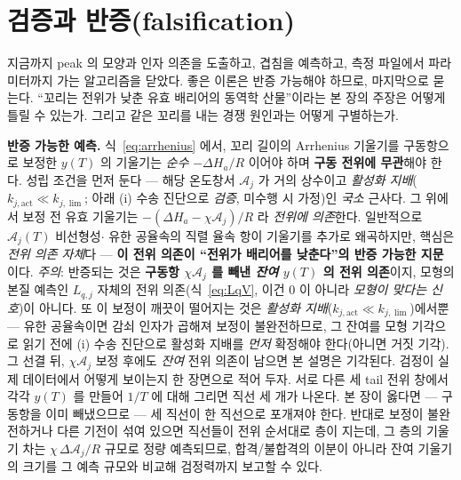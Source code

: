 \documentclass[11pt,a4paper]{article}
\begin{document}
\section{검증과 반증(falsification)}\label{sec:falsify}
지금까지 peak 의 모양과 인자 의존을 도출하고, 겹침을 예측하고, 측정 파일에서 파라미터까지 가는 알고리즘을
닫았다. 좋은 이론은 반증 가능해야 하므로, 마지막으로 묻는다. ``꼬리는 전위가 낮춘 유효 배리어의 동역학
산물''이라는 본 장의 주장은 어떻게 틀릴 수 있는가. 그리고 같은 꼬리를 내는 경쟁 원인과는 어떻게 구별하는가.

\textbf{반증 가능한 예측.} 식~\eqref{eq:arrhenius} 에서, 꼬리 길이의 Arrhenius 기울기를 구동항으로 보정한 $y(T)$
의 기울기는 \emph{순수} $-\Delta H_a/R$ 이어야 하며 \textbf{구동 전위에 무관}해야 한다. 성립 조건을 먼저 둔다 — 해당 온도창서 $\mathcal A_j$ 가 거의 상수이고 \emph{활성화 지배}($k_{j,\mathrm{act}}\ll
k_{j,\lim}$; 아래 (i) 수송 진단으로 \emph{검증}, 미수행 시 가정)인 \emph{국소} 근사다. 그 위에서 보정 전 유효
기울기는 $-(\Delta H_a-\chi\mathcal A_j)/R$ 라 \emph{전위에 의존}한다. 일반적으로 $\mathcal A_j(T)$ 비선형성$\cdot$
유한 공율속의 직렬 율속 항이 기울기를 추가로 왜곡하지만, 핵심은 \emph{전위 의존 자체}다 — \textbf{이 전위
의존이 ``전위가 배리어를 낮춘다''의 반증 가능한 지문}이다. \emph{주의}: 반증되는 것은 \textbf{구동항 $\chi\mathcal A_j$ 를
빼낸 \emph{잔여} $y(T)$ 의 전위 의존}이지, 모형의 본질 예측인 $L_{q,j}$ 자체의 전위 의존(식~\eqref{eq:LqV}, 이건 $0$ 이
아니라 \emph{모형이 맞다는 신호})이 아니다. 또 이 보정이 깨끗이 떨어지는 것은 \emph{활성화 지배}($k_{j,\mathrm{act}}\ll
k_{j,\lim}$)에서뿐 — 유한 공율속이면 감쇠 인자가 곱해져 보정이 불완전하므로, 그 잔여를 모형 기각으로 읽기 전에 (i)
수송 진단으로 활성화 지배를 \emph{먼저} 확정해야 한다(아니면 거짓 기각). 그 선결 뒤, $\chi\mathcal A_j$ 보정 후에도
\emph{잔여} 전위 의존이 남으면 본 설명은 기각된다. 검정이 실제 데이터에서 어떻게 보이는지 한 장면으로
적어 두자. 서로 다른 세 tail 전위 창에서 각각 $y(T)$ 를 만들어 $1/T$ 에 대해 그리면 직선 세 개가 나온다.
본 장이 옳다면 — 구동항을 이미 빼냈으므로 — 세 직선이 한 직선으로 포개져야 한다. 반대로 보정이 불완전하거나
다른 기전이 섞여 있으면 직선들이 전위 순서대로 층이 지는데, 그 층의 기울기 차는 $\chi\,\Delta\mathcal A_j/R$
규모로 정량 예측되므로, 합격/불합격의 이분이 아니라 잔여 기울기의 크기를 그 예측 규모와 비교해 검정력까지
보고할 수 있다.
\end{document}
